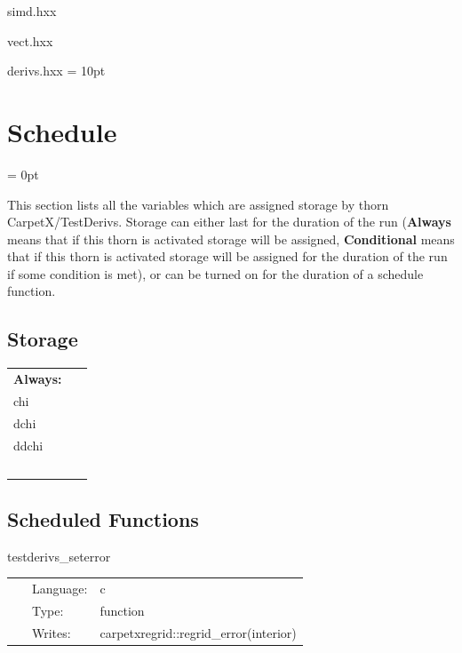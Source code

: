 simd.hxx

vect.hxx

derivs.hxx
\vspace{2mm}\parskip = 10pt 

\section{Schedule} 


\parskip = 0pt


\noindent This section lists all the variables which are assigned storage by thorn CarpetX/TestDerivs.  Storage can either last for the duration of the run ({\bf Always} means that if this thorn is activated storage will be assigned, {\bf Conditional} means that if this thorn is activated storage will be assigned for the duration of the run if some condition is met), or can be turned on for the duration of a schedule function.


\subsection*{Storage}

\hspace{5mm}

 \begin{tabular*}{160mm}{ll} 

{\bf Always:}&  ~ \\ 
 chi & ~\\ 
 dchi & ~\\ 
 ddchi & ~\\ 
~ & ~\\ 
\end{tabular*} 


\subsection*{Scheduled Functions}
\vspace{5mm}


\hspace{5mm} testderivs\_seterror 

\hspace{5mm}{\it set up test grid } 


\hspace{5mm}

 \begin{tabular*}{160mm}{cll} 
~ & Language:  & c \\ 
~ & Type:  & function \\ 
~ & Writes:  & carpetxregrid::regrid\_error(interior) \\ 
\end{tabular*} 


